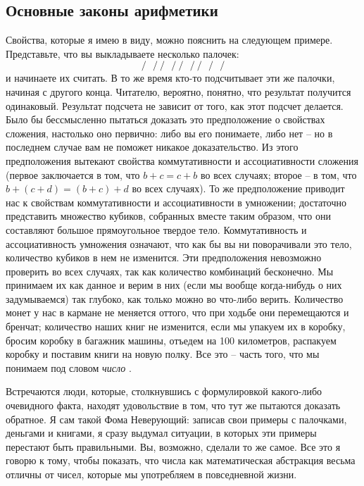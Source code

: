 \documentclass[../main.tex]{subfiles}
\begin{document}
\subsection{Основные законы арифметики}

Свойства, которые я имею в виду, можно пояснить на следующем примере.
Представьте, что вы выкладываете несколько палочек:
\[
    \bm{/~~~/~/~~~/~/~~~/~/~~~/~~~/}
\]
и начинаете их считать.
В то же время кто-то подсчитывает эти же палочки, начиная с другого конца.
Читателю, вероятно, понятно, что результат получится одинаковый.
Результат подсчета не зависит от того, как этот подсчет делается.
Было бы бессмысленно пытаться доказать это предположение о свойствах сложения, настолько оно первично: либо вы его понимаете, либо нет \--- но в последнем случае вам не поможет никакое доказательство.
Из этого предположения вытекают свойства коммутативности и ассоциативности сложения (первое заключается в том, что $b + c = c + b$ во всех случаях; второе \--- в том, что $b + (c + d) = (b + c) + d$ во всех случаях).
То же предположение приводит нас к свойствам коммутативности и ассоциативности в умножении; достаточно представить множество кубиков, собранных вместе таким образом, что они составляют большое прямоугольное твердое тело. Коммутативность и ассоциативность умножения означают, что как бы вы ни поворачивали это тело, количество кубиков в нем не изменится. Эти предположения невозможно проверить во всех случаях, так как количество комбинаций бесконечно. Мы принимаем их как данное и верим в них (если мы вообще когда-нибудь о них задумываемся) так глубоко, как только можно во что-либо верить. Количество монет у нас в кармане не меняется оттого, что при ходьбе они перемещаются и бренчат; количество наших книг не изменится, если мы упакуем их в коробку, бросим коробку в багажник машины, отъедем на 100 километров, распакуем коробку и поставим книги на новую полку. Все это \--- часть того, что мы понимаем под словом \emph{число} .

Встречаются люди, которые, столкнувшись с формулировкой какого-либо очевидного факта, находят удовольствие в том, что тут же пытаются доказать обратное. Я сам такой Фома Неверующий: записав свои примеры с палочками, деньгами и книгами, я сразу выдумал ситуации, в которых эти примеры перестают быть правильными. Вы, возможно, сделали то же самое. Все это я говорю к тому, чтобы показать, что числа как математическая абстракция весьма отличны от чисел, которые мы употребляем в повседневной жизни.
\end{document}
